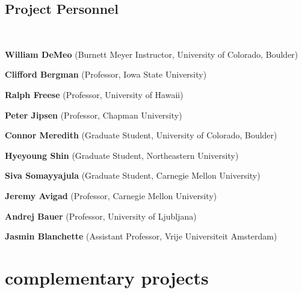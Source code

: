 \documentclass[11pt]{amsart}  %
\begin{document}
\subsection{Project Personnel}\
\vskip5mm

\vskip2mm
\hskip4.7mm {\bf William DeMeo} (Burnett Meyer Instructor, University of Colorado, Boulder)

\vskip5mm


\vskip2mm
\hskip4.7mm {\bf Clifford Bergman} (Professor, Iowa State University)

\vskip2mm
\hskip4.7mm {\bf Ralph Freese} (Professor, University of Hawaii)

\vskip2mm
\hskip4.7mm {\bf Peter Jipsen} (Professor, Chapman University)

\vskip2mm
\hskip4.7mm {\bf Connor Meredith} (Graduate Student, University of Colorado, Boulder)

\vskip2mm
\hskip4.7mm {\bf Hyeyoung Shin} (Graduate Student, Northeastern University)

\vskip2mm
\hskip4.7mm {\bf Siva Somayyajula} (Graduate Student, Carnegie Mellon University)



\vskip5mm


\vskip2mm
\hskip4.7mm {\bf Jeremy Avigad} (Professor, Carnegie Mellon University)

\vskip2mm
\hskip4.7mm {\bf Andrej Bauer} (Professor, University of Ljubljana)

\vskip2mm
\hskip4.7mm {\bf Jasmin Blanchette} (Assistant Professor, Vrije Universiteit Amsterdam)


  


\newpage







\section{complementary projects}
\end{document}
